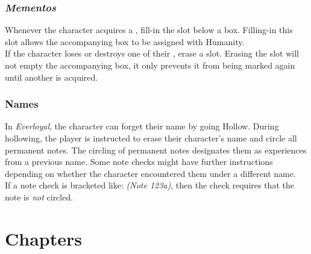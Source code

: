 \documentclass[12pt]{article}
\begin{document}
\begin{multicols*}{2}
\subsubsection{\emph{Mementos}}
\hypertarget{mementos}{}\hypertarget{memento}{}
Whenever the character acquires a , fill-in the  slot below a  box. Filling-in this slot allows the accompanying  box to be assigned with Humanity.\\
If the character loses or destroys one of their , erase a  slot. Erasing the  slot will not empty the accompanying  box, it only prevents it from being marked again until another  is acquired.

\subsubsection{Names}
In \emph{Everloyal}, the character can forget their name by going Hollow. During hollowing, the player is instructed to erase their character’s name and circle all permanent notes. The circling of permanent notes designates them as experiences from a previous name. Some note checks might have further instructions depending on whether the character encountered them under a different name.\\
If a note check is bracketed like: \emph{(Note 123a)}, then the check requires that the note is \emph{not} circled.

\end{multicols*}
\pagebreak



\section{Chapters}



\pagebreak



\pagebreak

\renewcommand{\arraystretch}{1.5}



\pagebreak



\pagebreak
\end{document}
